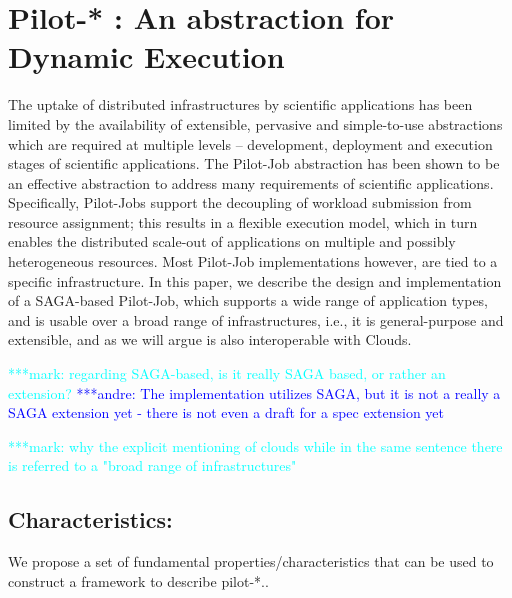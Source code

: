 \documentclass[]{article}
\newcommand{\alnote}[1]{ {\textcolor{blue} { ***andre: #1 }}}
\newcommand{\msnote}[1]{ {\textcolor{cyan} { ***mark: #1 }}}
\newcommand{\alnote}[1]{}
\begin{document}
\section{Pilot-* : An abstraction for Dynamic Execution}

The uptake of distributed infrastructures by scientific applications
has been limited by the availability of extensible, pervasive and
simple-to-use abstractions which are required at multiple levels –
development, deployment and execution stages of scientific
applications. The Pilot-Job abstraction has been shown to be an
effective abstraction to address many requirements of scientific
applications. Specifically, Pilot-Jobs support the decoupling of
workload submission from resource assignment; this results in a
flexible execution model, which in turn enables the distributed
scale-out of applications on multiple and possibly heterogeneous
resources. Most Pilot-Job implementations however, are tied to a
specific infrastructure. In this paper, we describe the design and
implementation of a SAGA-based Pilot-Job, which supports a wide range
of application types, and is usable over a broad range of
infrastructures, i.e., it is general-purpose and extensible, and as we
will argue is also interoperable with Clouds.

\msnote{regarding SAGA-based, is it really SAGA based, or rather an
  extension?}\alnote{The implementation utilizes SAGA, but it is not a
  really a SAGA extension yet - there is not even a draft for a spec
  extension yet}

\msnote{why the explicit mentioning of clouds while in the same sentence there is referred to a "broad range of infrastructures"}

\subsection{Characteristics:}

We propose a set of fundamental properties/characteristics that can be
used to construct a framework to describe pilot-*..
\end{document}
